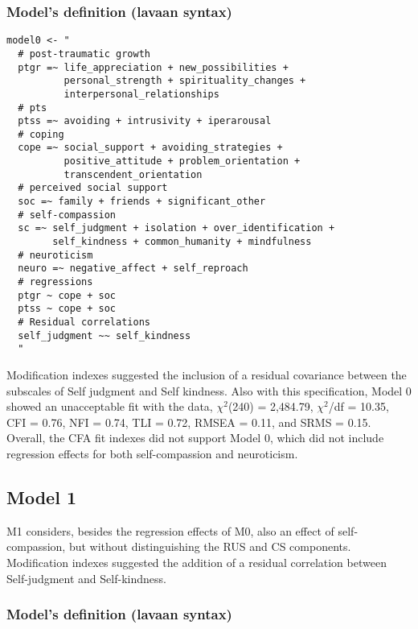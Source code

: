 \begin{appendix}
\hypertarget{models-definition-lavaan-syntax}{%
\subsubsection{Model's definition (lavaan
syntax)}\label{models-definition-lavaan-syntax}}

\begin{verbatim}
model0 <- "
  # post-traumatic growth
  ptgr =~ life_appreciation + new_possibilities + 
          personal_strength + spirituality_changes + 
          interpersonal_relationships
  # pts
  ptss =~ avoiding + intrusivity + iperarousal
  # coping
  cope =~ social_support + avoiding_strategies + 
          positive_attitude + problem_orientation + 
          transcendent_orientation
  # perceived social support
  soc =~ family + friends + significant_other
  # self-compassion
  sc =~ self_judgment + isolation + over_identification +
        self_kindness + common_humanity + mindfulness
  # neuroticism
  neuro =~ negative_affect + self_reproach
  # regressions
  ptgr ~ cope + soc  
  ptss ~ cope + soc 
  # Residual correlations
  self_judgment ~~ self_kindness
  "
\end{verbatim}

Modification indexes suggested the inclusion of a residual covariance
between the subscales of Self judgment and Self kindness. Also with this
specification, Model 0 showed an unacceptable fit with the data,
\(\chi^2\)(240) = 2,484.79, \(\chi^2\)/df = 10.35, CFI = 0.76, NFI =
0.74, TLI = 0.72, RMSEA = 0.11, and SRMS = 0.15. Overall, the CFA fit
indexes did not support Model 0, which did not include regression
effects for both self-compassion and neuroticism.

\newpage

\hypertarget{model-1}{%
\subsection{Model 1}\label{model-1}}

M1 considers, besides the regression effects of M0, also an effect of
self-compassion, but without distinguishing the RUS and CS components.
Modification indexes suggested the addition of a residual correlation
between Self-judgment and Self-kindness.

\hypertarget{models-definition-lavaan-syntax-1}{%
\subsubsection{Model's definition (lavaan
syntax)}\label{models-definition-lavaan-syntax-1}}


\end{appendix}
